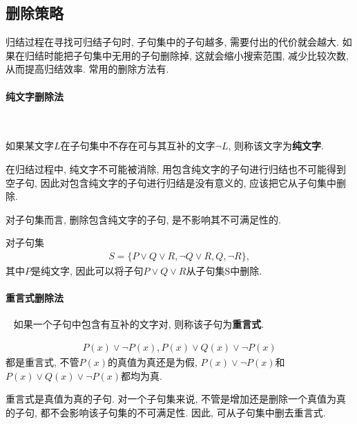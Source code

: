 \subsection{删除策略}
归结过程在寻找可归结子句时, 子句集中的子句越多, 需要付出的代价就会越大. 如果在归结时能把子句集中无用的子句删除掉, 这就会缩小搜索范围, 减少比较次数, 从而提高归结效率.
常用的删除方法有.
\paragraph{纯文字删除法}~{}

如果某文字$L$在子句集中不存在可与其互补的文字$\neg L$, 则称该文字为\textbf{纯文字}.

在归结过程中, 纯文字不可能被消除, 用包含纯文字的子句进行归结也不可能得到空子句, 因此对包含纯文字的子句进行归结是没有意义的, 应该把它从子句集中删除.

对子句集而言, 删除包含纯文字的子句, 是不影响其不可满足性的.
\begin{example}
对子句集
\begin{align}
  S=\{P\vee Q\vee R, \neg Q\vee R,  Q, \neg R\},
\end{align}
其中$P$是纯文字, 因此可以将子句$P\vee Q\vee R$从子句集S中删除.
\end{example}
\paragraph{重言式删除法}~{}
如果一个子句中包含有互补的文字对, 则称该子句为\textbf{重言式}.
\begin{example}
\begin{align}
  P(x)\vee \neg P(x),  P(x)\vee Q(x)\vee \neg P(x)
\end{align}
都是重言式, 不管$P(x)$的真值为真还是为假, $P(x)\vee \neg P(x)$和$P(x)\vee Q(x)\vee \neg P(x)$都均为真.
\end{example}

重言式是真值为真的子句. 对一个子句集来说, 不管是增加还是删除一个真值为真的子句, 都不会影响该子句集的不可满足性. 因此, 可从子句集中删去重言式.
